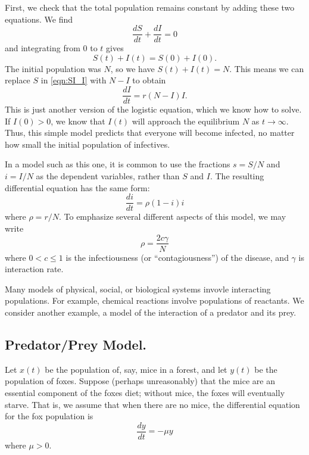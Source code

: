\documentclass[reqno]{immbook}
\numberwithin{equation}{chapter}
\numberwithin{question}{section}
\numberwithin{theorem}{chapter}
\numberwithin{figure}{chapter}
\theoremstyle{definition}
\begin{document}
First, we check that the total population remains constant by adding these
two equations.  We find
\begin{equation}
  \frac{dS}{dt} + \frac{dI}{dt} = 0
\end{equation}
and integrating from $0$ to $t$ gives
\begin{equation}
  S(t) + I(t) = S(0)+I(0).
\end{equation}
The initial population was $N$, so we have
$S(t)+I(t)=N$.
This means we can replace $S$ in \eqref{eqn:SI_I} with
$N-I$ to obtain
\begin{equation}
  \frac{dI}{dt} = r(N-I)I.
\end{equation}
This is just another version of the logistic equation, 
which we know how to solve.
If $I(0)>0$, we know that $I(t)$ will approach the
equilibrium $N$ as $t\rightarrow\infty$.
Thus, this simple model predicts that
everyone will become infected, no matter how small
the initial population of infectives.

In a model such as this one, it is common to
use the fractions $s = S/N$ and $i = I/N$ as the dependent
variables, rather than $S$ and $I$.  The resulting
differential equation has the same form:
\begin{equation}
   \frac{di}{dt} = \rho(1-i)i
\end{equation}
where $\rho = r/N$.
To emphasize several different aspects
of this model, we may write
\begin{equation}
   \rho = \frac{2c\gamma}{N}
\end{equation}
where $0 < c \le 1$ is the infectiousness
(or ``contagiousness'') of the disease, and 
$\gamma$ is interaction rate.

\medskip
Many models of physical, social, or biological systems
invovle interacting populations.
For example, chemical reactions involve populations
of reactants.  We consider another example, a model
of the interaction of a predator and its prey.

\subsection*{Predator/Prey Model.}
Let $x(t)$ be the population of, say, mice in a forest,
and let $y(t)$ be the population of foxes.
Suppose (perhaps unreasonably) that the mice
are an essential component of the foxes diet; without
mice, the foxes will eventually starve.
That is, we assume that when there are no mice, the
differential equation for the fox population is
\begin{equation}
   \frac{dy}{dt} = -\mu y
\end{equation}
where $\mu > 0$.
\end{document}
